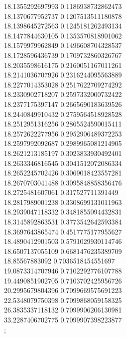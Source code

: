 {18.1355292697993 0.1186938732862473 \\
18.1370677952737 0.1207513511180878 \\
18.1398645272563 0.1245181262493134 \\
18.1477844630105 0.1353570818901062 \\
18.1579979962849 0.1496608704328537 \\
18.1728596436739 0.1709732860326767 \\
18.2035598616175 0.2160051167011261 \\
18.2141036707926 0.2316244095563889 \\
18.2277014353028 0.2517622709274292 \\
18.2330902718207 0.2597332000732422 \\
18.2377175397147 0.2665690183639526 \\
18.2440849910432 0.2759564518928528 \\
18.2512951316256 0.2865524590015411 \\
18.2572622277956 0.2952906489372253 \\
18.2597992092687 0.2989965081214905 \\
18.2621213185197 0.3023833930492401 \\
18.2633346816545 0.3041512072086334 \\
18.2652245702426 0.3069018423557281 \\
18.2670703041488 0.3095848858356476 \\
18.2725481607061 0.317527711391449 \\
18.2817989001238 0.3308699131011963 \\
18.2939047118332 0.3481855094432831 \\
18.3145892863531 0.3773542642593384 \\
18.3697643865474 0.4517775177955627 \\
18.4890412901503 0.5791029930114746 \\
18.6507137055109 0.6681476235389709 \\
18.85567883092 0.7036518454551697 \\
19.0873314707946 0.7102292776107788 \\
19.4490851902705 0.7103702425956726 \\
20.2995679804396 0.7099669575691223 \\
22.5348079750398 0.7099868059158325 \\
26.3835337118132 0.7099906206130981 \\
33.2287406702775 0.7099907398223877 \\
};
